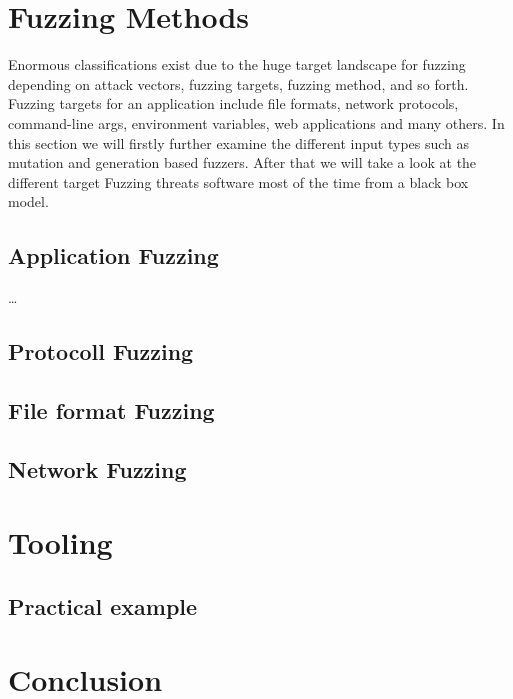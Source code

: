 \documentclass[journal=tosc,final]{iacrtrans}
\begin{document}
\newpage
\section{Fuzzing Methods}
Enormous classifications exist due to the huge target landscape for fuzzing depending on attack vectors, fuzzing targets, fuzzing method, and so forth. Fuzzing targets for an application include file formats, network protocols, command-line args, environment variables, web applications and many others. In this section we will firstly  further examine the different input types such as mutation and generation based fuzzers. After that we will take a look at the different target
Fuzzing threats software most of the time from a black box model. 

\subsection{Application Fuzzing}
\dots
\subsection{Protocoll Fuzzing}
\subsection{File format Fuzzing}
\subsection{Network Fuzzing}
\section{Tooling}
\subsection{Practical example}
\section{Conclusion}





\end{document}
